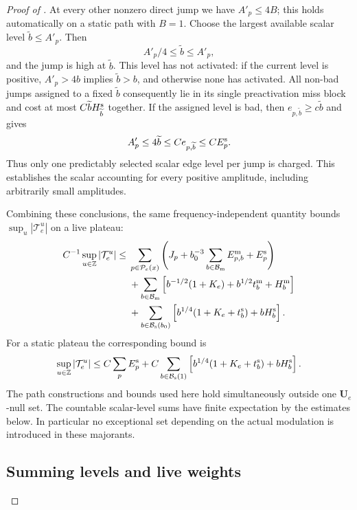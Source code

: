 \begin{proof}[Proof of ]
At every other nonzero direct jump we have $A'_p\le4B$; this holds
automatically on a static path with $B=1$.  Choose the largest available
scalar level $\widetilde b\le A'_p$.  Then
\[
 A'_p/4\le\widetilde b\le A'_p,
\]
and the jump is high at $\widetilde b$.  This level has not activated:
if the current level is positive, $A'_p>4b$ implies
$\widetilde b>b$, and otherwise none has activated.  All non-bad jumps
assigned to a fixed $\widetilde b$ consequently lie in its single
preactivation miss block and cost at most
$C\widetilde b H_{\widetilde b}^{\rm s}$ together.  If the assigned
level is bad, then
$e_{p,\widetilde b}\ge c\widetilde b$ and
 gives
\[
 A'_p\le4\widetilde b\le C e_{p,\widetilde b}\le C E_p^{\rm s}.
\]
Thus only one predictably selected scalar edge level per jump is
charged.  This establishes the scalar accounting for every positive
amplitude, including arbitrarily small amplitudes.

Combining these conclusions, the same frequency-independent quantity
bounds $\sup_u|\mathcal T_e^u|$ on a live plateau:
\begin{align}
 C^{-1}\sup_{u\in\mathbb Z}|\mathcal T_e^u|
 \le{}&\sum_{p\in\mathcal P_e(x)}
       \left(J_p+b_0^{-3}\sum_{b\in\mathcal B_{\rm m}}E_{p,b}^{\rm m}
                     +E_p^{\rm s}\right)\notag\\
 &+\sum_{b\in\mathcal B_{\rm m}}
       \left[b^{-1/2}(1+K_e)+b^{1/2}t_b^{\rm m}+H_b^{\rm m}\right]\notag\\
 &+\sum_{b\in\mathcal B_{\rm s}(b_0)}
       \left[b^{1/4}(1+K_e+t_b^{\rm s})+bH_b^{\rm s}\right].
       \label{eq:09-live-majorant}
\end{align}
For a static plateau the corresponding bound is
\begin{equation}\label{eq:09-static-majorant}
 \sup_{u\in\mathbb Z}|\mathcal T_e^u|
 \le C\sum_pE_p^{\rm s}
    +C\sum_{b\in\mathcal B_{\rm s}(1)}
       \left[b^{1/4}(1+K_e+t_b^{\rm s})+bH_b^{\rm s}\right].
\end{equation}
The path constructions and bounds used here hold simultaneously outside
one $\mathbf U_e$-null set.  The countable scalar-level sums have finite
expectation by the estimates below.  In particular no exceptional set
depending on the actual modulation is introduced in these majorants.

\subsection*{Summing levels and live weights}


\end{proof}
